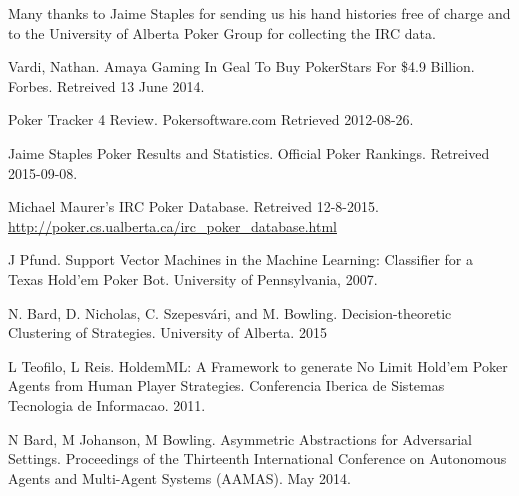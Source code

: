 \documentclass[twoside]{article}
\begin{document}
\begin{multicols}{2}
Many thanks to Jaime Staples for sending us his hand histories free of charge and to the University of Alberta Poker Group for collecting the IRC data. 



\begin{thebibliography}{99} %

 Vardi, Nathan. Amaya Gaming In Geal To Buy PokerStars For \$4.9 Billion. Forbes. Retreived 13 June 2014. 

 Poker Tracker 4 Review. Pokersoftware.com Retrieved 2012-08-26.

 Jaime Staples Poker Results and Statistics. Official Poker Rankings. Retreived 2015-09-08.

 Michael Maurer's IRC Poker Database. Retreived 12-8-2015.
\url{http://poker.cs.ualberta.ca/irc_poker_database.html}

 J Pfund. Support Vector Machines in the Machine Learning: Classifier for a Texas Hold'em Poker Bot.  University of Pennsylvania, 2007.

 N. Bard, D. Nicholas, C. Szepesvári, and M. Bowling. Decision-theoretic Clustering of Strategies. University of Alberta. 2015

 L Teofilo, L Reis. HoldemML: A Framework to generate No Limit Hold’em Poker Agents from Human Player Strategies. Conferencia Iberica de Sistemas Tecnologia de Informacao. 2011.

 N Bard, M Johanson, M Bowling. Asymmetric Abstractions for Adversarial Settings. Proceedings of the Thirteenth International Conference on Autonomous Agents and Multi-Agent Systems (AAMAS). May 2014.
\end{thebibliography}


\end{multicols}
\end{document}
